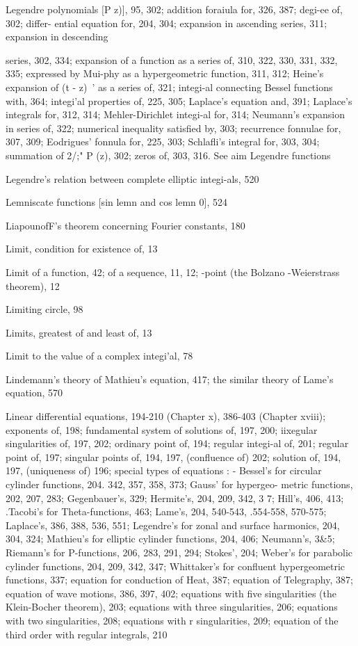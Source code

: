 Legendre polynomials [P   z)], 95, 302; addition foraiula for, 326, 387; degi-ee of, 302; differ-
ential equation for, 204, 304; expansion in ascending series, 311; expansion in descending

%
%

series, 302, 334; expansion of a function as a series of, 310, 322, 330, 331, 332, 335;
expressed by Mui-phy as a hypergeometric function, 311, 312; Heine's expansion of (t - z)~'
as a series of, 321; integi-al connecting Bessel functions with, 364; integi'al properties of,
225, 305; Laplace's equation and, 391; Laplace's integrals for, 312, 314; Mehler-Dirichlet
integi-al for, 314; Neumann's expansion in series of, 322; numerical inequality satisfied by,
303; recurrence fonnulae for, 307, 309; Eodrigues' fonnula for, 225, 303; Schlafli's integral
for, 303, 304; summation of 2/;" P  (z), 302; zeros of, 303, 316. See aim Legendre functions

Legendre's relation between complete elliptic integi-als, 520

Lemniscate functions [sin lemn and cos lemn 0], 524

LiapounofF's theorem concerning Fourier constants, 180

Limit, condition for existence of, 13

Limit of a function, 42; of a sequence, 11, 12; -point (the Bolzano -Weierstrass theorem), 12

Limiting circle, 98

Limits, greatest of and least of, 13

Limit to the value of a complex integi'al, 78

Lindemann's theory of Mathieu's equation, 417; the similar theory of Lame's equation, 570

Linear differential equations, 194-210 (Chapter x), 386-403 (Chapter xviii); exponents of, 198;
fundamental system of solutions of, 197, 200; iixegular singularities of, 197, 202; ordinary
point of, 194; regular integi-al of, 201; regular point of, 197; singular points of, 194, 197,
(confluence of) 202; solution of, 194, 197, (uniqueness of) 196; special types of equations :
- Bessel's for circular cylinder functions, 204. 342, 357, 358, 373; Gauss' for hypergeo-
metric functions, 202, 207, 283; Gegenbauer's, 329; Hermite's, 204, 209, 342, 3 7; Hill's,
406, 413; .Tacobi's for Theta-functions, 463; Lame's, 204, 540-543, .554-558, 570-575;
Laplace's, 386, 388, 536, 551; Legendre's for zonal and surface harmonics, 204, 304, 324;
Mathieu's for elliptic cylinder functions, 204, 406; Neumann's, 3\&5; Riemann's for
P-functions, 206, 283, 291, 294; Stokes', 204; Weber's for parabolic cylinder functions,
204, 209, 342, 347; Whittaker's for confluent hypergeometric functions, 337; equation for
conduction of Heat, 387; equation of Telegraphy, 387; equation of wave motions, 386, 397,
402; equations with five singularities (the Klein-Bocher theorem), 203; equations with three
singularities, 206; equations with two singularities, 208; equations with r singularities,
209; equation of the third order with regular integrals, 210

